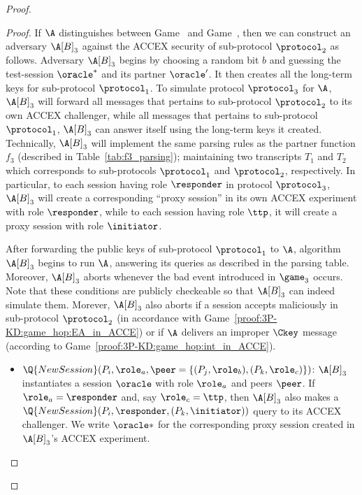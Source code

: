 \begin{proof}
\iffalse
\begin{proof}
If $\A$ distinguishes between Game~\prevgame{} and Game~\game{},
then we can construct an adversary $\A[B]_3$ against the ACCEX security of sub-protocol $\protocol_2$ as follows.
Adversary $\A[B]_3$ begins by choosing a random bit $b$ and guessing the test-session $\oracle^*$ and its partner $\oracle'$.
It then creates all the long-term keys for sub-protocol $\protocol_1$.
To simulate protocol $\protocol_3$ for $\A$,
$\A[B]_3$ will forward all messages that pertains to sub-protocol $\protocol_2$ to its own ACCEX challenger,
while all messages that pertains to sub-protocol $\protocol_1$,
$\A[B]_3$ can answer itself using the long-term keys it created. 
Technically, $\A[B]_3$ will implement the same parsing rules as the partner function $f_3$
(described in Table~\ref{tab:f3_parsing});
maintaining two transcripts $T_1$ and $T_2$ which corresponds to sub-protocols $\protocol_1$ and $\protocol_2$,
respectively. 
In particular, 
to each session having role $\responder$ in protocol $\protocol_3$,
$\A[B]_3$ will create a corresponding ``proxy session'' in its own ACCEX experiment with role $\responder$,
while to each session having role $\ttp$,
it will create a proxy session with role $\initiator$.

After forwarding the public keys of sub-protocol $\protocol_1$ to $\A$,
algorithm $\A[B]_3$ begins to run $\A$,
answering its queries as described in the parsing table. Moreover, $\A[B]_3$ aborts whenever
the bad event introduced in $\game_3$ occurs. Note that these conditions are
publicly checkeable so that $\A[B]_3$ can indeed simulate them. Morever, $\A[B]_3$ 
also aborts if a session accepts maliciously in sub-protocol $\protocol_2$
(in accordance with Game~\ref{proof:3P-KD:game_hop:EA_in_ACCE}) or if
$\A$ delivers an improper $\Ckey$ message 
(according to Game~\ref{proof:3P-KD:game_hop:int_in_ACCE}).
\begin{itemize}
	\item $\Q{NewSession}(P_i, \role_a, \peer = \lbrace (P_j, \role_b), (P_k, \role_c) \rbrace)$: 
	$\A[B]_3$ instantiates a session $\oracle$	with role $\role_a$ and peers $\peer$.	
	If $\role_a = \responder$ and,
	say $\role_c = \ttp$,
	then $\A[B]_3$ also makes a $\Q{NewSession}(P_i,\responder, (P_k, \initiator))$ query to its ACCEX challenger.
	We write $\oracle*$ for the corresponding proxy session created in $\A[B]_3$'s ACCEX experiment.
 




\end{itemize}
\end{proof}
\end{proof}
